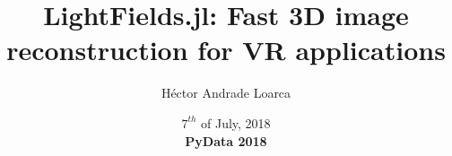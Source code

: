\title[LightFields.jl]{LightFields.jl: Fast 3D image reconstruction for VR applications}
\author{H\'ector Andrade Loarca}
\date[PyData Berlin 2018]{$7^{th}$ of July, 2018 \\ \textbf{PyData 2018}}

\newcommand{\mylogo}{\texttt{[image: images/bms-logo-button.png]}}

\begin{frame}[plain]
	\titlepage
\end{frame}

